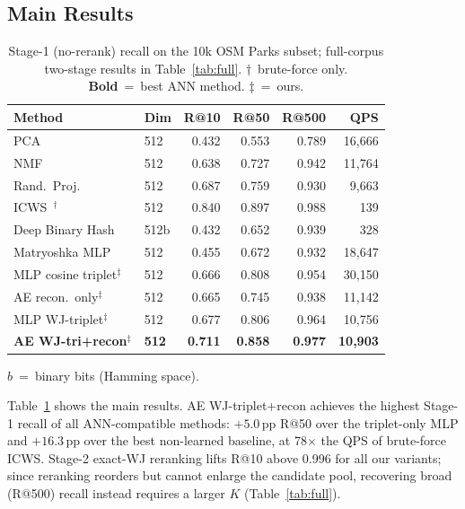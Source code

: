 \documentclass[sigconf]{acmart}
\begin{document}
\subsection{Main Results}

\begin{table}[t]
\centering
\caption{Stage-1 (no-rerank) recall on the 10k OSM Parks subset; full-corpus
two-stage results in Table~\ref{tab:full}. $\dagger$~brute-force only.
\textbf{Bold}~=~best ANN method. $\ddagger$~=~ours.}
\label{tab:results}
\setlength{\tabcolsep}{4pt}
\small
\begin{tabular}{@{}llrrrr@{}}
\toprule
Method & Dim & R@10 & R@50 & R@500 & QPS \\
\midrule
PCA~\cite{jolliffe02}                   & 512  & 0.432 & 0.553 & 0.789 & 16{,}666 \\
NMF~\cite{nmf99}                        & 512  & 0.638 & 0.727 & 0.942 & 11{,}764 \\
Rand.\ Proj.~\cite{achlioptas03}        & 512  & 0.687 & 0.759 & 0.930 &  9{,}663 \\
\addlinespace[3pt]
ICWS~\cite{ioffe10}$^\dagger$           & 512  & 0.840 & 0.897 & 0.988 &     139 \\
Deep Binary Hash~\cite{deephashsurvey22}& 512b & 0.432 & 0.652 & 0.939 &     328 \\
\addlinespace[3pt]
Matryoshka MLP~\cite{matryoshka22}      & 512  & 0.455 & 0.672 & 0.932 & 18{,}647 \\
\addlinespace[3pt]
MLP cosine triplet$^\ddagger$           & 512  & 0.666 & 0.808 & 0.954 & 30{,}150 \\
AE recon.\ only$^\ddagger$              & 512  & 0.665 & 0.745 & 0.938 & 11{,}142 \\
MLP WJ-triplet$^\ddagger$               & 512  & 0.677 & 0.806 & 0.964 & 10{,}756 \\
\textbf{AE WJ-tri+recon}$^\ddagger$     & \textbf{512} & \textbf{0.711} & \textbf{0.858} & \textbf{0.977} & \textbf{10{,}903} \\
\bottomrule
\end{tabular}
{\scriptsize $b$~=~binary bits (Hamming space).}
\end{table}

Table~\ref{tab:results} shows the main results. AE WJ-triplet+recon achieves the
highest Stage-1 recall of all ANN-compatible methods: $+5.0$\,pp R@50 over the
triplet-only MLP and $+16.3$\,pp over the best non-learned baseline, at 78$\times$
the QPS of brute-force ICWS. Stage-2 exact-WJ reranking lifts R@10 above 0.996 for
all our variants; since reranking reorders but cannot enlarge the candidate pool,
recovering broad (R@500) recall instead requires a larger $K$ (Table~\ref{tab:full}).
\end{document}
